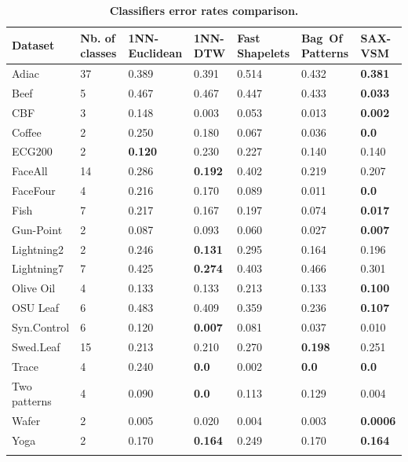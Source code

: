 \documentclass[conference]{IEEEtran}
\begin{document}
\begin{footnotesize}
\begin{table}[t]
\vspace{-0.3cm}
\caption{\bf Classifiers error rates comparison.}
 \label{perf_table}
\centering
\begin{tabularx}{\linewidth}{@{} l *6X @{}}
\hline
Dataset & Nb. of classes & 1NN-Euclidean & 1NN-DTW & Fast Shapelets &  \mbox{Bag Of} \mbox{Patterns}
& SAX-VSM\\
\hline
Adiac        &37  & 0.389   & 0.391  & 0.514  & 0.432  & \textbf{0.381}\\
Beef         &5   & 0.467   & 0.467  & 0.447  & 0.433  & \textbf{0.033}\\
CBF         & 3  & 0.148    & 0.003  & 0.053    & 0.013 & \textbf{0.002} \\
Coffee       &2    & 0.250   & 0.180  & 0.067     & 0.036     & \textbf{0.0} \\
ECG200     &2   & \textbf{0.120}  & 0.230  & 0.227     & 0.140   & 0.140 \\
FaceAll      &14  & 0.286   & \textbf{0.192}  & 0.402     & 0.219   & 0.207\\
FaceFour    &4   & 0.216   & 0.170  & 0.089     & 0.011   & \textbf{0.0} \\
Fish         &7   & 0.217   & 0.167  & 0.197    & 0.074   & \textbf{0.017} \\
Gun-Point    &2   & 0.087   & 0.093  & 0.060     & 0.027     & \textbf{0.007} \\
Lightning2    &2   & 0.246   & \textbf{0.131}  & 0.295  & 0.164  & 0.196 \\
Lightning7    &7   & 0.425   & \textbf{0.274}  & 0.403  & 0.466  & 0.301 \\
Olive Oil     &4   & 0.133   & 0.133  & 0.213     & 0.133  & \textbf{0.100}\\
OSU Leaf    &6   & 0.483   & 0.409  & 0.359     & 0.236  & \textbf{0.107} \\
Syn.Control  &6   & 0.120   & \textbf{0.007}  & 0.081     & 0.037  & 0.010 \\
Swed.Leaf   &15  & 0.213   & 0.210 & 0.270 & \textbf{0.198} & 0.251 \\
Trace       &4   & 0.240   & \textbf{0.0}    & 0.002  & \textbf{0.0} & \textbf{0.0} \\
Two patterns &4   & 0.090   & \textbf{0.0}    & 0.113   & 0.129      & 0.004 \\
Wafer        &2    & 0.005   & 0.020     & 0.004  & 0.003 & \textbf{0.0006} \\
Yoga        &2    & 0.170   & \textbf{0.164}  & 0.249 & 0.170 & \textbf{0.164} \\
\hline
\vspace{-0.1cm}
\end{tabularx}
\end{table}
\end{footnotesize}
\end{document}
